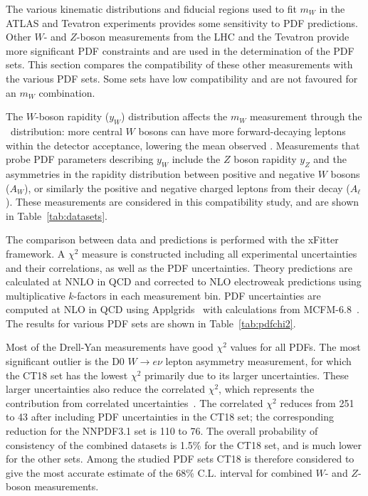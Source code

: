 
The various kinematic distributions and fiducial regions used to fit $m_W$ in the ATLAS and
Tevatron experiments provides some sensitivity to PDF predictions.  Other $W$- and $Z$-boson 
measurements from the LHC and the 
Tevatron provide more significant PDF constraints and are used in the determination of the 
PDF sets.  This section compares the compatibility of these other measurements with the
various PDF sets.  Some sets have low compatibility and are not favoured for an $m_W$
combination.

The $W$-boson rapidity ($y_W$) distribution affects the $m_W$ measurement through the
\pTl~distribution: more central $W$ bosons can have more forward-decaying leptons within the 
detector acceptance, lowering the mean observed \pTl.  Measurements that probe PDF parameters 
describing $y_W$ include the $Z$ boson rapidity $y_Z$ and the asymmetries in the rapidity 
distribution between positive and negative $W$ bosons ($A_W$), or similarly the positive and 
negative charged leptons from their decay ($A_\ell$).  These measurements are considered in this 
compatibility study, and are shown in Table~\ref{tab:datasets}.  

The comparison between data and predictions is performed with the xFitter~\cite{Bertone:2017tig} 
framework.  A $\chi^2$ measure is constructed including all experimental uncertainties and their 
correlations, as well as the PDF uncertainties.
Theory predictions
are calculated at NNLO in QCD and corrected to NLO electroweak predictions using multiplicative $k$-factors
in each measurement bin.  PDF uncertainties are computed at NLO in QCD using Applgrids~\cite{Carli:2010rw}
with calculations from MCFM-6.8~\cite{Campbell:1999ah}.
The results for various PDF sets are shown in Table~\ref{tab:pdfchi2}.

Most of the Drell-Yan measurements have good $\chi^2$ values for all PDFs.  The most significant 
outlier is the D0 $W\rightarrow e \nu$ lepton asymmetry measurement, for which the CT18 set has 
the lowest $\chi^2$ primarily due to its larger uncertainties.  These larger uncertainties also
reduce the correlated $\chi^2$, which represents the contribution from correlated
uncertainties~\cite{alekhin:2015herafitter}.
The correlated $\chi^2$ reduces from 251 to 43 after including
PDF uncertainties in the CT18 set; the corresponding reduction for the NNPDF3.1 set is 110 to 76.
The overall probability of consistency of the combined datasets is 1.5\% for the CT18 set, and is
much lower for the other sets.
Among the studied PDF sets CT18 is therefore considered to give the most accurate estimate of the
68\% C.L. interval for combined $W$- and $Z$-boson measurements.

